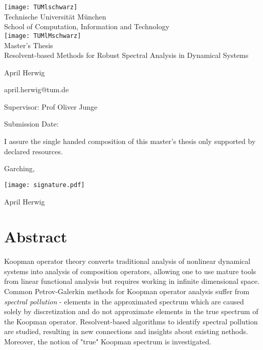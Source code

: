 \pagestyle{empty}
\begin{titlepage}
\begin{center}
\texttt{[image: TUMlschwarz]}\\[3mm]
\sf
{\Large
  Technische Universit\"at M\"unchen\\[5mm]
  School of Computation, Information and Technology\\[8mm]
}
\normalsize
\texttt{[image: TUMlMschwarz]}\\[15mm]

Master's Thesis\\[15mm]

{\LARGE
  Resolvent-based Methods for Robust Spectral Analysis in Dynamical Systems
}
\bigskip

\normalsize

April Herwig

april.herwig@tum.de
\end{center}
\vspace*{75mm}

Supervisor: Prof Oliver Junge
\medskip

Submission Date:  %

\end{titlepage}

\vspace*{150mm}

I assure the single handed composition of this master's thesis only supported by declared resources.
\bigskip

Garching, %

\texttt{[image: signature.pdf]}

April Herwig
\newpage

\section*{Abstract}

Koopman operator theory converts traditional analysis of nonlinear dynamical systems into 
analysis of composition operators, allowing one to use mature tools from linear functional 
analysis but requires working in infinite dimensional space. Common Petrov-Galerkin 
methods for Koopman operator analysis suffer from \emph{spectral pollution} - elements 
in the approximated spectrum which are caused solely by discretization and do not 
approximate elements in the true spectrum of the Koopman operator. Resolvent-based 
algorithms to identify spectral pollution are studied, resulting in new connections and 
insights about existing nethods. Moreover, the notion of "true" Koopman spectrum is 
investigated. 
